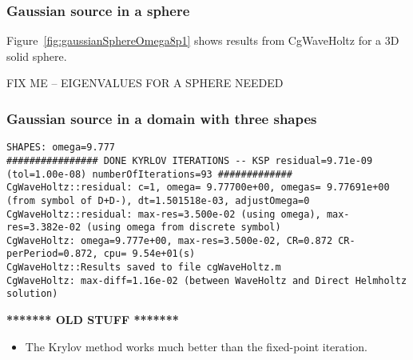 \clearpage
\subsubsection{Gaussian source in a sphere}
Figure~\ref{fig:gaussianSphereOmega8p1} shows results from CgWaveHoltz for a 3D solid sphere.

{\red FIX ME -- EIGENVALUES FOR A SPHERE NEEDED}





\clearpage
\subsubsection{Gaussian source in a domain with three shapes}
\bni
{}

\begin{Verbatim}[fontsize=\scriptsize]
SHAPES: omega=9.777
################ DONE KYRLOV ITERATIONS -- KSP residual=9.71e-09 (tol=1.00e-08) numberOfIterations=93 #############
CgWaveHoltz::residual: c=1, omega= 9.77700e+00, omegas= 9.77691e+00 (from symbol of D+D-), dt=1.501518e-03, adjustOmega=0
CgWaveHoltz::residual: max-res=3.500e-02 (using omega), max-res=3.382e-02 (using omega from discrete symbol)
CgWaveHoltz: omega=9.777e+00, max-res=3.500e-02, CR=0.872 CR-perPeriod=0.872, cpu= 9.54e+01(s)
CgWaveHoltz::Results saved to file cgWaveHoltz.m
CgWaveHoltz: max-diff=1.16e-02 (between WaveHoltz and Direct Helmholtz solution)
\end{Verbatim}





\clearpage
\mni
\textbf{******* OLD STUFF *******}
\begin{itemize}
  \item The Krylov method works much better than the fixed-point iteration.
\end{itemize}  

